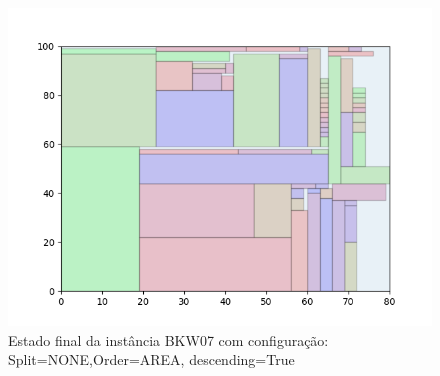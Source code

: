 \begin{figure}[H]
    \centering
    \caption[]{Estado final da instância BKW07 com configuração: Split=NONE,Order=AREA, descending=True}
    \label{fig:bkw07-none-area-true}
    \includegraphics[scale=0.5]{output/figures/bkw/bkw07/none/area/true/00}
\end{figure}